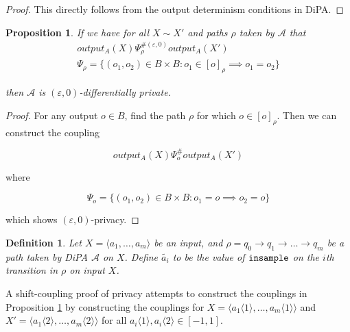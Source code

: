 \documentclass{article}
\newtheorem{proposition}{Proposition}[section]
\newtheorem{definition}{Definition}[section]
\renewcommand{\epsilon}{\varepsilon}
\newcommand{\insample}{\textup{\texttt{insample}}}
\newcommand{\1}{\langle 1 \rangle}
\newcommand{\2}{\langle 2 \rangle}
\begin{document}
\begin{proof}
    This directly follows from the output determinism conditions in DiPA. 
\end{proof}


\begin{proposition}
    \label{prop:output_coupling}
    If we have for all $X \sim X'$ and paths $\rho$ taken by $\mathcal{A}$ that 
    \begin{align*}
        output_A(X) \Psi_{\rho}^{\#(\epsilon, 0)} output_A(X') \\[1em]
        \Psi_{\rho} = \{(o_1, o_2) \in B \times B : o_1 \in [o]_\rho \implies o_1 = o_2\}
    \end{align*}

    then $\mathcal{A}$ is $(\epsilon, 0)$-differentially private.
\end{proposition}

\begin{proof}
    For any output $o \in B$, find the path $\rho$ for which $o \in [o]_\rho$. Then we can construct the coupling

    \[output_A(X) \Psi_{o}^{\#} output_A(X')\]

    where 

    \[\Psi_{o} = \{(o_1, o_2) \in B \times B : o_1 = o \implies o_2 = o\}\]

    which shows $(\epsilon, 0)$-privacy. 
\end{proof}

\begin{definition}
    Let  $X = \langle a_1, \dots, a_m \rangle$ be an input, and $\rho = q_0 \to q_1 \to \dots \to q_m$ be a path taken by DiPA $\mathcal{A}$ on $X$. Define $\tilde{a_i}$ to be the value of $\insample$ on the $i$th transition in $\rho$ on input $X$.
\end{definition}

A shift-coupling proof of privacy attempts to construct the couplings in Proposition \ref{prop:output_coupling}  by constructing the couplings for $X = \langle a_1 \1, \dots, a_m \1 \rangle$ and $X' = \langle a_1 \2, \dots, a_m \2 \rangle$ for all $a_i \1, a_i \2 \in [-1, 1]$.
\end{document}

